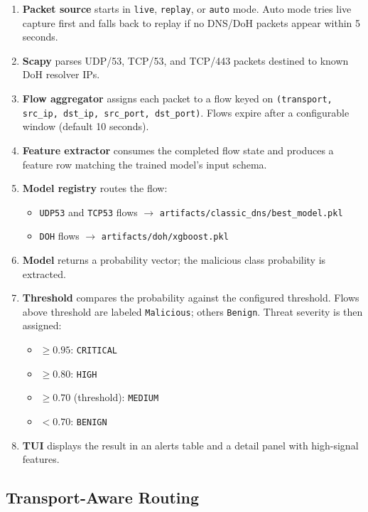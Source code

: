 \documentclass[12pt,a4paper]{article}
\begin{document}
\begin{enumerate}
    \item \textbf{Packet source} starts in \texttt{live}, \texttt{replay}, or \texttt{auto} mode. Auto mode tries live capture first and falls back to replay if no DNS/DoH packets appear within 5 seconds.
    \item \textbf{Scapy} parses UDP/53, TCP/53, and TCP/443 packets destined to known DoH resolver IPs.
    \item \textbf{Flow aggregator} assigns each packet to a flow keyed on \texttt{(transport, src\_ip, dst\_ip, src\_port, dst\_port)}. Flows expire after a configurable window (default 10 seconds).
    \item \textbf{Feature extractor} consumes the completed flow state and produces a feature row matching the trained model's input schema.
    \item \textbf{Model registry} routes the flow:
    \begin{itemize}
        \item \texttt{UDP53} and \texttt{TCP53} flows $\rightarrow$ \texttt{artifacts/classic\_dns/best\_model.pkl}
        \item \texttt{DOH} flows $\rightarrow$ \texttt{artifacts/doh/xgboost.pkl}
    \end{itemize}
    \item \textbf{Model} returns a probability vector; the malicious class probability is extracted.
    \item \textbf{Threshold} compares the probability against the configured threshold. Flows above threshold are labeled \texttt{Malicious}; others \texttt{Benign}. Threat severity is then assigned:
    \begin{itemize}
        \item $\geq 0.95$: \texttt{CRITICAL}
        \item $\geq 0.80$: \texttt{HIGH}
        \item $\geq 0.70$ (threshold): \texttt{MEDIUM}
        \item $< 0.70$: \texttt{BENIGN}
    \end{itemize}
    \item \textbf{TUI} displays the result in an alerts table and a detail panel with high-signal features.
\end{enumerate}

\subsection{Transport-Aware Routing}
\end{document}
